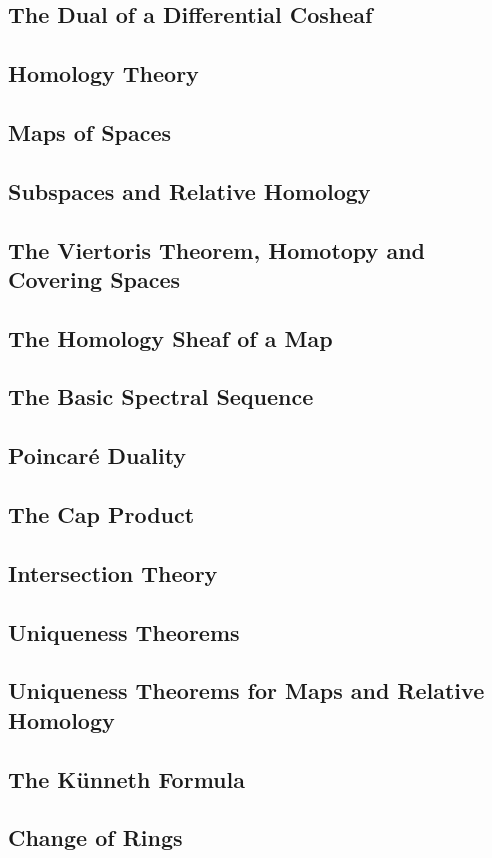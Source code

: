 \subsection{The Dual of a Differential Cosheaf}
\subsection{Homology Theory}
\subsection{Maps of Spaces}
\subsection{Subspaces and Relative Homology}
\subsection{The Viertoris Theorem, Homotopy and Covering Spaces}
\subsection{The Homology Sheaf of a Map}
\subsection{The Basic Spectral Sequence}
\subsection{Poincaré Duality}
\subsection{The Cap Product}
\subsection{Intersection Theory}
\subsection{Uniqueness Theorems}
\subsection{Uniqueness Theorems for Maps and Relative Homology}
\subsection{The Künneth Formula}
\subsection{Change of Rings}
